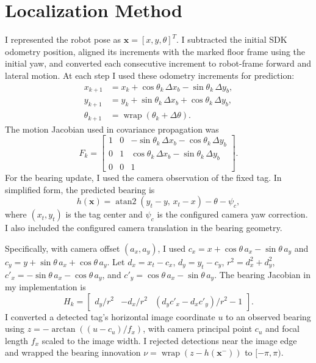 \documentclass[11pt]{article}
\begin{document}
\section{Localization Method}
I represented the robot pose as $\mathbf{x}=[x,y,\theta]^T$. I subtracted the initial SDK odometry position, aligned its increments with the marked floor frame using the initial yaw, and converted each consecutive increment to robot-frame forward and lateral motion. At each step I used these odometry increments for prediction:
\begin{align}
x_{k+1} &= x_k + \cos\theta_k\,\Delta x_b - \sin\theta_k\,\Delta y_b,\\
y_{k+1} &= y_k + \sin\theta_k\,\Delta x_b + \cos\theta_k\,\Delta y_b,\\
\theta_{k+1} &= \operatorname{wrap}(\theta_k+\Delta\theta).
\end{align}
The motion Jacobian used in covariance propagation was
\begin{equation}
F_k=\begin{bmatrix}
1&0&-\sin\theta_k\,\Delta x_b-\cos\theta_k\,\Delta y_b\\
0&1& \cos\theta_k\,\Delta x_b-\sin\theta_k\,\Delta y_b\\
0&0&1
\end{bmatrix}.
\end{equation}
For the bearing update, I used the camera observation of the fixed tag. In simplified form, the predicted bearing is
\begin{equation}
h(\mathbf{x})=\operatorname{atan2}(y_t-y,\,x_t-x)-\theta-\psi_c,
\end{equation}
where $(x_t,y_t)$ is the tag center and $\psi_c$ is the configured camera yaw correction. I also included the configured camera translation in the bearing geometry.

Specifically, with camera offset $(a_x,a_y)$, I used $c_x=x+\cos\theta\,a_x-\sin\theta\,a_y$ and $c_y=y+\sin\theta\,a_x+\cos\theta\,a_y$. Let $d_x=x_t-c_x$, $d_y=y_t-c_y$, $r^2=d_x^2+d_y^2$, $c'_x=-\sin\theta\,a_x-\cos\theta\,a_y$, and $c'_y=\cos\theta\,a_x-\sin\theta\,a_y$. The bearing Jacobian in my implementation is
\begin{equation}
H_k=\begin{bmatrix}d_y/r^2 & -d_x/r^2 & (d_yc'_x-d_xc'_y)/r^2-1\end{bmatrix}.
\end{equation}
I converted a detected tag's horizontal image coordinate $u$ to an observed bearing using $z=-\arctan((u-c_u)/f_x)$, with camera principal point $c_u$ and focal length $f_x$ scaled to the image width. I rejected detections near the image edge and wrapped the bearing innovation $\nu=\operatorname{wrap}(z-h(\mathbf{x}^-))$ to $[-\pi,\pi)$.
\end{document}
